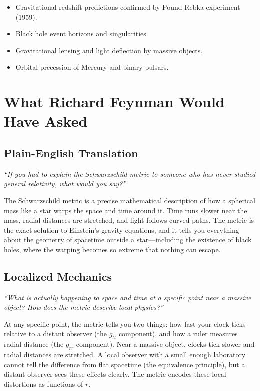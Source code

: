 \begin{itemize}
    \item Gravitational redshift predictions confirmed by Pound-Rebka experiment (1959).
    \item Black hole event horizons and singularities.
    \item Gravitational lensing and light deflection by massive objects.
    \item Orbital precession of Mercury and binary pulsars.
\end{itemize}
\section*{What Richard Feynman Would Have Asked}

\subsection*{Plain-English Translation}
\textit{``If you had to explain the Schwarzschild metric to someone who has never studied general relativity, what would you say?''}

The Schwarzschild metric is a precise mathematical description of how a spherical mass like a star warps the space and time around it. Time runs slower near the mass, radial distances are stretched, and light follows curved paths. The metric is the exact solution to Einstein's gravity equations, and it tells you everything about the geometry of spacetime outside a star---including the existence of black holes, where the warping becomes so extreme that nothing can escape.

\subsection*{Localized Mechanics}
\textit{``What is actually happening to space and time at a specific point near a massive object? How does the metric describe local physics?''}

At any specific point, the metric tells you two things: how fast your clock ticks relative to a distant observer (the $g_{tt}$ component), and how a ruler measures radial distance (the $g_{rr}$ component). Near a massive object, clocks tick slower and radial distances are stretched. A local observer with a small enough laboratory cannot tell the difference from flat spacetime (the equivalence principle), but a distant observer sees these effects clearly. The metric encodes these local distortions as functions of $r$.

